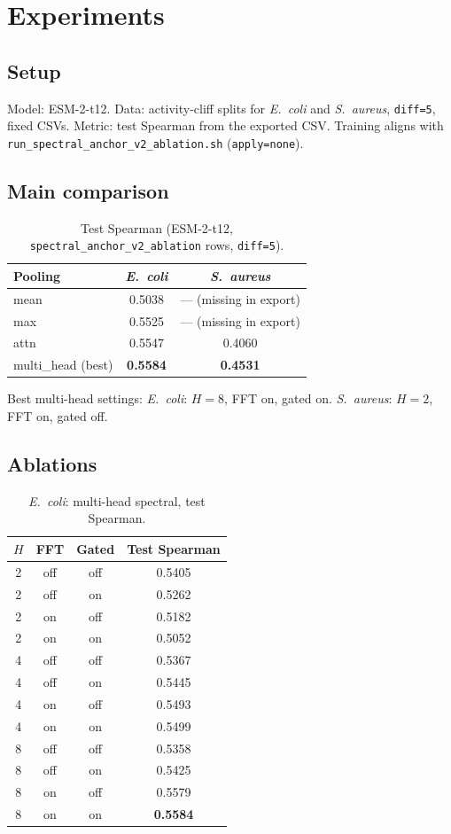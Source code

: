 \documentclass[11pt]{article}
\begin{document}
\section{Experiments}
\subsection{Setup}
Model: ESM-2-t12. Data: activity-cliff splits for \textit{E.~coli} and \textit{S.~aureus}, \texttt{diff=5}, fixed CSVs. Metric: test Spearman from the exported CSV. Training aligns with \texttt{run\_spectral\_anchor\_v2\_ablation.sh} (\texttt{apply=none}).

\subsection{Main comparison}
\begin{table}[h]
\centering
\caption{Test Spearman (ESM-2-t12, \texttt{spectral\_anchor\_v2\_ablation} rows, \texttt{diff=5}).}
\begin{tabular}{lcc}
\toprule
Pooling & \textit{E.~coli} & \textit{S.~aureus} \\
\midrule
mean & 0.5038 & --- (missing in export) \\
max & 0.5525 & --- (missing in export) \\
attn & 0.5547 & 0.4060 \\
multi\_head (best) & \textbf{0.5584} & \textbf{0.4531} \\
\bottomrule
\end{tabular}
\end{table}

\noindent Best multi-head settings: \textit{E.~coli}: $H{=}8$, FFT on, gated on. \textit{S.~aureus}: $H{=}2$, FFT on, gated off.

\subsection{Ablations}
\begin{table}[h]
\centering
\caption{\textit{E.~coli}: multi-head spectral, test Spearman.}
\begin{tabular}{ccc c}
\toprule
$H$ & FFT & Gated & Test Spearman \\
\midrule
2 & off & off & 0.5405 \\
2 & off & on & 0.5262 \\
2 & on & off & 0.5182 \\
2 & on & on & 0.5052 \\
4 & off & off & 0.5367 \\
4 & off & on & 0.5445 \\
4 & on & off & 0.5493 \\
4 & on & on & 0.5499 \\
8 & off & off & 0.5358 \\
8 & off & on & 0.5425 \\
8 & on & off & 0.5579 \\
8 & on & on & \textbf{0.5584} \\
\bottomrule
\end{tabular}
\end{table}
\end{document}

